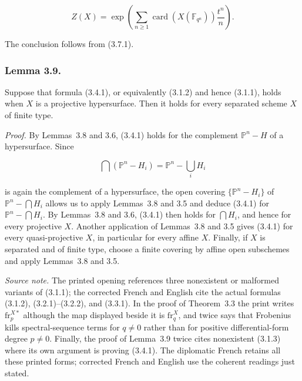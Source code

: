 \begin{equation}\tag{3.8.3}
Z(X)=\exp\!\left(
\sum_{n\geq1}\operatorname{card}(X(\mathbb F_{q^n}))\frac{t^n}{n}
\right).
\end{equation}

The conclusion follows from (3.7.1).

\subsubsection*{Lemma 3.9.}
Suppose that formula (3.4.1), or equivalently (3.1.2) and hence (3.1.1), holds
when $X$ is a projective hypersurface. Then it holds for every separated
scheme $X$ of finite type.

\medskip
\noindent\emph{Proof.}
By Lemmas~3.8 and 3.6, (3.4.1) holds for the complement
$\mathbb P^n-H$ of a hypersurface. Since

\[
\bigcap(\mathbb P^n-H_i)=\mathbb P^n-\bigcup_iH_i
\]

is again the complement of a hypersurface, the open covering
$\{\mathbb P^n-H_i\}$ of $\mathbb P^n-\bigcap H_i$ allows us to apply
Lemmas~3.8 and 3.5 and deduce (3.4.1) for
$\mathbb P^n-\bigcap H_i$. By Lemmas~3.8 and 3.6, (3.4.1) then holds for
$\bigcap H_i$, and hence for every projective $X$. Another application of
Lemmas~3.8 and 3.5 gives (3.4.1) for every quasi-projective $X$, in particular
for every affine $X$. Finally, if $X$ is separated and of finite type, choose
a finite covering by affine open subschemes and apply Lemmas~3.8 and 3.5.

\medskip
\noindent\emph{Source note.}
The printed opening references three nonexistent or malformed variants of
(3.1.1); the corrected French and English cite the actual formulas (3.1.2),
(3.2.1)--(3.2.2), and (3.3.1). In the proof of Theorem~3.3 the print writes
$\mathrm{fr}_p^{X*}$ although the map displayed beside it is
$\mathrm{fr}_q^X$, and twice says that Frobenius kills spectral-sequence terms
for $q\ne0$ rather than for positive differential-form degree $p\ne0$.
Finally, the proof of Lemma~3.9 twice cites nonexistent (3.1.3) where its own
argument is proving (3.4.1). The diplomatic French retains all these printed
forms; corrected French and English use the coherent readings just stated.
